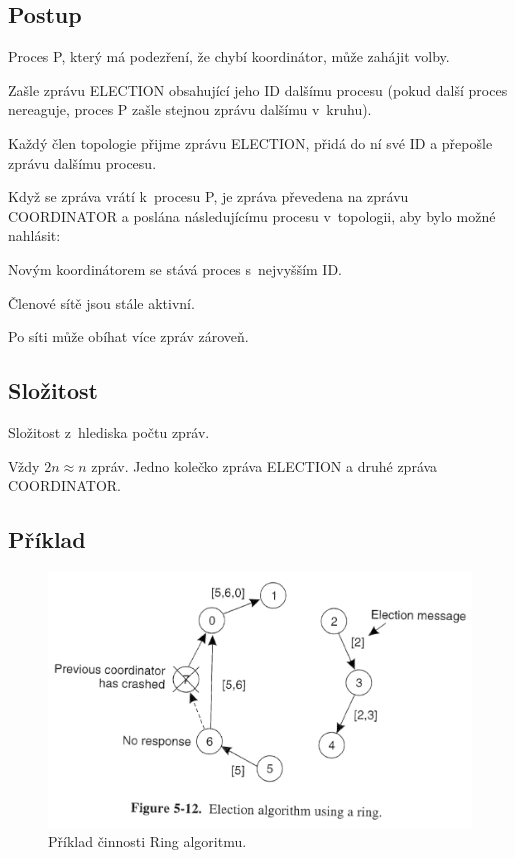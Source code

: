 \subsection{Postup}

\begin{compactitem}
    \item Proces P, který má podezření, že chybí koordinátor, může zahájit volby.
    \begin{compactenum}
        \item Zašle zprávu ELECTION obsahující jeho ID dalšímu procesu (pokud další proces nereaguje, proces P zašle stejnou zprávu dalšímu v~kruhu).
        \item Každý člen topologie přijme zprávu ELECTION, přidá do ní své ID a přepošle zprávu dalšímu procesu.
    \end{compactenum}
    \item Když se zpráva vrátí k~procesu P, je zpráva převedena na zprávu  COORDINATOR a poslána následujícímu procesu v~topologii, aby bylo možné nahlásit:
    \begin{compactenum}
        \item Novým koordinátorem se stává proces s~nejvyšším ID.
        \item Členové sítě jsou stále aktivní.
    \end{compactenum}
    \item Po síti může obíhat více zpráv zároveň.
\end{compactitem}

\subsection{Složitost}

Složitost z~hlediska počtu zpráv.

\bigskip\noindent Vždy $2n \approx n$ zpráv. Jedno kolečko  zpráva ELECTION a druhé zpráva COORDINATOR.

\subsection{Příklad}

\begin{figure}[H]
    \centering
    \includegraphics[width=1\linewidth]{example_ring.pdf}
    \caption{Příklad činnosti Ring algoritmu.}
\end{figure}

